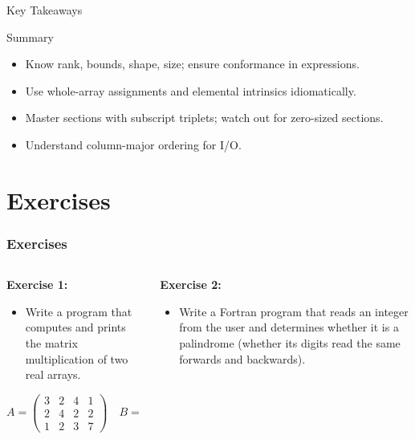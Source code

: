 \begin{frame}{Key Takeaways}
  \begin{block}{Summary}
    \begin{itemize}
      \item Know rank, bounds, shape, size; ensure conformance in expressions.
      \item Use whole-array assignments and elemental intrinsics idiomatically.
      \item Master sections with subscript triplets; watch out for zero-sized sections.
      \item Understand column-major ordering for I/O.
    \end{itemize}
  \end{block}
\end{frame}

\section{Exercises}

\begin{frame}[fragile]
	\frametitle{Exercises}
	\begin{columns}[T]
		\begin{column}{0.5\textwidth}
			\textbf{Exercise 1:}
			\begin{itemize}
				\item Write a program that computes and prints the matrix multiplication of two real arrays.
			\end{itemize}
			\vspace*{0.2cm}
			\[
			A = \begin{pmatrix}
			3 & 2 & 4 & 1 \\
			2 & 4 & 2 & 2 \\
			1 & 2 & 3 & 7
			\end{pmatrix}
			\quad
			B = \begin{pmatrix}
			3 & 2 & 4 \\
			2 & 1 & 2 \\
			3 & 0 & 2
			\end{pmatrix}
			\]
		\end{column}
		
		\begin{column}{0.5\textwidth}
			\textbf{Exercise 2:}
			\begin{itemize}
				\item Write a Fortran program that reads an integer from the user and determines whether it is a palindrome (whether its digits read the same forwards and backwards).
			\end{itemize}
			
		\end{column}
	\end{columns}
\end{frame}
